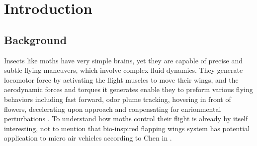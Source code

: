\documentclass[sigchi]{acmart}
\begin{document}
\section{Introduction}

\subsection{Background}




Insects like moths have very simple brains, yet they are capable of precise and subtle flying maneuvers, which involve complex fluid dynamics. They generate locomotor force by activating the flight muscles to move their wings, and the aerodynamic forces and torques it generates enable they to preform various flying behaviors including fast forward, odor plume tracking, hovering in front of flowers, decelerating upon approach and conpensating for enrionmental perturbations \cite{Stevenson1665}  \cite{Willis1991}
. To understand how moths control their flight is already by itself interesting, not to mention that  bio-inspired flapping wings system has potential application to micro air vehicles according to Chen in \cite{Chen_2018}. 
\end{document}
